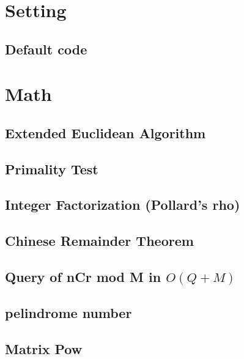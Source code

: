 \documentclass[9pt,landscape,a4paper,twocolumn]{extarticle}
\begin{document}
\tableofcontents

\newpage
\section{Setting}

\subsection{Default code}


\section{Math}

\subsection{Extended Euclidean Algorithm}


\subsection{Primality Test}


\subsection{Integer Factorization (Pollard's rho)}


\subsection{Chinese Remainder Theorem}


\subsection{Query of nCr mod M in $O(Q+M)$}


\subsection{pelindrome number}


\subsection{Matrix Pow}

\end{document}
